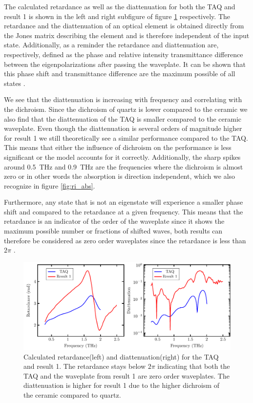 The calculated retardance as well as the diattenuation for both the TAQ and result 1 is shown in the left and right subfigure of figure \ref{fig:cl4_ret_diat} respectively. The retardance and the diattenuation of an optical element is obtained directly from the Jones matrix describing the element and is therefore independent of the input state. Additionally, as a reminder the retardance and diattenuation are, respectively, defined as the phase and relative intensity transmittance difference between the eigenpolarizations after passing the waveplate. It can be shown that this phase shift and transmittance difference are the maximum possible of all states \cite{Lu1994}. 

We see that the diattenuation is increasing with frequency and correlating with the dichroism. Since the dichroism of quartz is lower compared to the  ceramic we also find that the diattenuation of the TAQ is smaller compared to the ceramic waveplate. Even though the diattenuation is several orders of magnitude higher for result 1 we still theoretically see a similar performance compared to the TAQ. This means that either the influence of dichroism on the performance is less significant or the model accounts for it correctly. Additionally, the sharp spikes around \SI{0.5}{\tera \hertz} and \SI{0.9}{\tera \hertz} are the frequencies where the dichroism is almost zero or in other words the absorption is direction independent, which we also recognize in figure \ref{fig:ri_abs}. 

Furthermore, any state that is not an eigenstate will experience a smaller phase shift and compared to the retardance at a given frequency. This means that the retardance is an indicator of the order of the waveplate since it shows the maximum possible number or fractions of shifted waves, both results can therefore be considered as zero order waveplates since the retardance is less than $2\pi$ \cite{Samoylov2004}. 

\begin{figure}[H]
    \centering
    \includegraphics[scale=0.75]{images/results/plots/ceramic/ret_and_diat.pdf}
    \caption{Calculated retardance(left) and diattenuation(right) for the TAQ and result 1. The retardance stays below $2\pi$ indicating that both the TAQ and the waveplate from result 1 are zero order waveplates. The diattenuation is higher for result 1 due to the higher dichroism of the  ceramic compared to quartz.}%
    \label{fig:cl4_ret_diat}
\end{figure}

